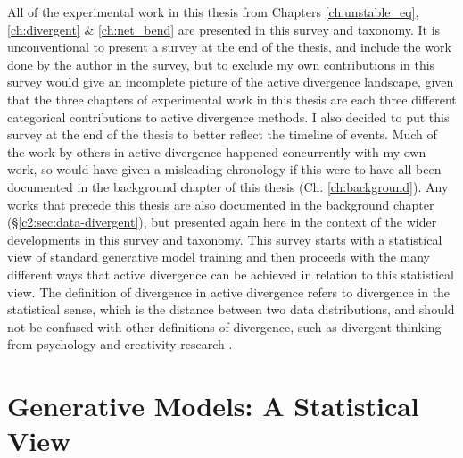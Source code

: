 All of the experimental work in this thesis from Chapters \ref{ch:unstable_eq}, \ref{ch:divergent} \& \ref{ch:net_bend} are presented in this survey and taxonomy.
It is unconventional to present a survey at the end of the thesis, and include the work done by the author in the survey, but to exclude my own contributions in this survey would give an incomplete picture of the active divergence landscape, given that the three chapters of experimental work in this thesis are each three different categorical contributions to active divergence methods.
I also decided to put this survey at the end of the thesis to better reflect the timeline of events.
Much of the work by others in active divergence happened concurrently with my own work, so would have given a misleading chronology if this were to have all been documented in the background chapter of this thesis (Ch. \ref{ch:background}). 
Any works that precede this thesis are also documented in the background chapter (\S \ref{c2:sec:data-divergent}), but presented again here in the context of the wider developments in this survey and taxonomy. 
This survey starts with a statistical view of standard generative model training and then proceeds with the many different ways that active divergence can be achieved in relation to this statistical view.
The definition of divergence in active divergence refers to divergence in the statistical sense, which is the distance between two data distributions, and should not be confused with other definitions of divergence, such as divergent thinking from psychology and creativity research \citep{guilford1957creative}.

\section{Generative Models: A Statistical View}

